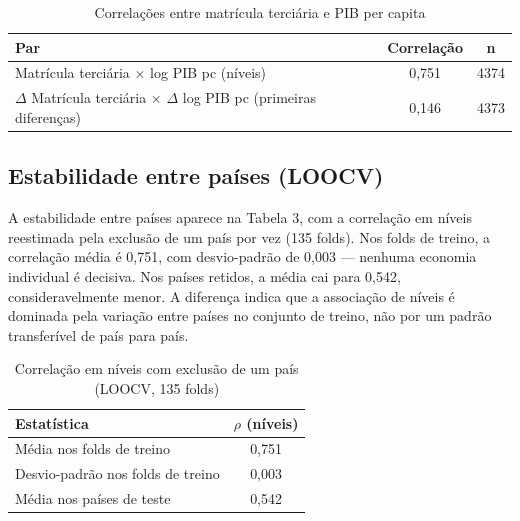 \documentclass[12pt,a4paper]{article}
\begin{document}
\begin{table}[htbp]
\centering
\caption{Correlações entre matrícula terciária e PIB per capita}
\label{tab:correlacoes}
\small
\begin{tabular}{>{\raggedright\arraybackslash}p{7.5cm}cc}
\toprule
Par & Correlação & n \\
\midrule
Matrícula terciária $\times$ log PIB pc (níveis) & 0,751 & 4374 \\
$\Delta$ Matrícula terciária $\times$ $\Delta$ log PIB pc (primeiras diferenças) & 0,146 & 4373 \\
\bottomrule
\end{tabular}
\par{}
\end{table}

\subsection{Estabilidade entre países (LOOCV)}

A estabilidade entre países aparece na Tabela 3, com a correlação em níveis reestimada pela exclusão de um país por vez (135 folds). Nos folds de treino, a correlação média é 0,751, com desvio-padrão de 0,003 --- nenhuma economia individual é decisiva. Nos países retidos, a média cai para 0,542, consideravelmente menor. A diferença indica que a associação de níveis é dominada pela variação entre países no conjunto de treino, não por um padrão transferível de país para país.

\begin{table}[htbp]
\centering
\caption{Correlação em níveis com exclusão de um país (LOOCV, 135 folds)}
\label{tab:loocv}
\small
\begin{tabular}{lc}
\toprule
Estatística & $\rho$ (níveis) \\
\midrule
Média nos folds de treino & 0,751 \\
Desvio-padrão nos folds de treino & 0,003 \\
Média nos países de teste & 0,542 \\
\bottomrule
\end{tabular}
\par{}
\end{table}
\end{document}
